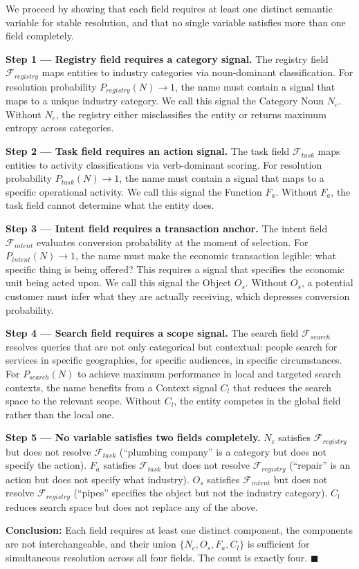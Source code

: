 \documentclass[12pt, openany]{book}
\theoremstyle{thmstyle}
\theoremstyle{defstyle}
\newcommand{\Nc}{N_c}
\newcommand{\Os}{O_s}
\newcommand{\Fa}{F_a}
\newcommand{\Cl}{C_l}
\begin{document}
\begin{proofbox}
We proceed by showing that each field requires at least one distinct semantic variable for stable resolution, and that no single variable satisfies more than one field completely.

\textbf{Step 1 --- Registry field requires a category signal.}
The registry field $\mathcal{F}_{registry}$ maps entities to industry categories via noun-dominant classification. For resolution probability $P_{registry}(N) \to 1$, the name must contain a signal that maps to a unique industry category. We call this signal the Category Noun $\Nc$. Without $\Nc$, the registry either misclassifies the entity or returns maximum entropy across categories.

\textbf{Step 2 --- Task field requires an action signal.}
The task field $\mathcal{F}_{task}$ maps entities to activity classifications via verb-dominant scoring. For resolution probability $P_{task}(N) \to 1$, the name must contain a signal that maps to a specific operational activity. We call this signal the Function $\Fa$. Without $\Fa$, the task field cannot determine what the entity does.

\textbf{Step 3 --- Intent field requires a transaction anchor.}
The intent field $\mathcal{F}_{intent}$ evaluates conversion probability at the moment of selection. For $P_{intent}(N) \to 1$, the name must make the economic transaction legible: what specific thing is being offered? This requires a signal that specifies the economic unit being acted upon. We call this signal the Object $\Os$. Without $\Os$, a potential customer must infer what they are actually receiving, which depresses conversion probability.

\textbf{Step 4 --- Search field requires a scope signal.}
The search field $\mathcal{F}_{search}$ resolves queries that are not only categorical but contextual: people search for services in specific geographies, for specific audiences, in specific circumstances. For $P_{search}(N)$ to achieve maximum performance in local and targeted search contexts, the name benefits from a Context signal $\Cl$ that reduces the search space to the relevant scope. Without $\Cl$, the entity competes in the global field rather than the local one.

\textbf{Step 5 --- No variable satisfies two fields completely.}
$\Nc$ satisfies $\mathcal{F}_{registry}$ but does not resolve $\mathcal{F}_{task}$ (``plumbing company'' is a category but does not specify the action). $\Fa$ satisfies $\mathcal{F}_{task}$ but does not resolve $\mathcal{F}_{registry}$ (``repair'' is an action but does not specify what industry). $\Os$ satisfies $\mathcal{F}_{intent}$ but does not resolve $\mathcal{F}_{registry}$ (``pipes'' specifies the object but not the industry category). $\Cl$ reduces search space but does not replace any of the above.

\textbf{Conclusion:} Each field requires at least one distinct component, the components are not interchangeable, and their union $\{\Nc, \Os, \Fa, \Cl\}$ is sufficient for simultaneous resolution across all four fields. The count is exactly four. $\blacksquare$
\end{proofbox}
\end{document}
